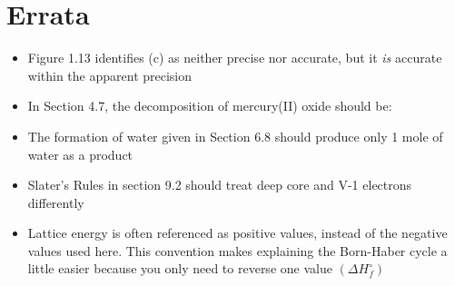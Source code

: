 \documentclass[12pt, openany, letterpaper]{memoir}
\begin{document}
\chapter{Errata}
\begin{itemize}
	\item Figure 1.13 identifies (c) as neither precise nor accurate, but it \emph{is} accurate within the apparent precision
	\item In Section 4.7, the decomposition of mercury(II) oxide should be: 
	\item The formation of water given in Section 6.8 should produce only 1 mole of water as a product
	\item Slater's Rules in section 9.2 should treat deep core and V-1 electrons differently
	\item Lattice energy is often referenced as positive values, instead of the negative values used here. This convention makes explaining the Born-Haber cycle a little easier because you only need to reverse one value $\left(\Delta H^\circ_f\right)$
\end{itemize}
\end{document}
